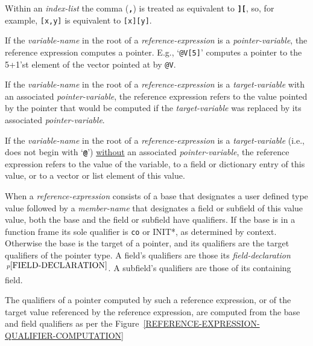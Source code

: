 \documentclass[12pt]{article}
\newcommand{\TT}[1]{{\tt \bfseries #1}}
\newcommand{\pagnote}[1]{$\,^{p\pageref{#1}}$}
\begin{document}
Within an {\em index-list} the comma (\TT{,}) is treated
as equivalent to \TT{][}, so, for example, {\tt [x,y]}
is equivalent to {\tt [x][y]}.

If the {\em variable-name} in the root of a {\em reference-expression}
is a {\em pointer-variable}, the reference expression computes a pointer.
E.g., `{\tt @V[5]}' computes a pointer to the 5+1'st element of the
vector pointed at by {\tt @V}.

If the {\em variable-name} in the root of a {\em reference-expression}
is a {\em target-variable} with an associated {\em pointer-variable},
the reference expression refers to the value pointed by the pointer
that would be computed if the {\em target-variable} was replaced by
its associated {\em pointer-variable}.

If the {\em variable-name} in the root of a {\em reference-expression}
is a {\em target-variable} (i.e., does not begin with `\TT{@}')
\underline{without}
an associated {\em pointer-variable},
the reference expression refers to the value of the variable,
to a field or dictionary entry of this value,
or to a vector or list element of this value.

When a {\em reference-expression}
\label{QUALIFIER-COMPUTATION}
consists of a base that designates
a user defined type value
followed by a {\em member-name} that designates a field
or subfield of this value
value, both the base and the field or
subfield have qualifiers.
If the base is in a function frame its sole qualifier is {\tt co}
or {\TT *INIT*}, as determined by context.
Otherwise the base is the target of a pointer, and its qualifiers
are the target qualifiers of the pointer type.  A field's qualifiers
are those its {\em field-declaration}\pagnote{FIELD-DECLARATION}.
A subfield's qualifiers are those of its containing field.

The qualifiers of a pointer computed by such a reference expression,
or of the target value referenced by the reference expression,
are computed from the base and field qualifiers as per the
Figure~\ref{REFERENCE-EXPRESSION-QUALIFIER-COMPUTATION}%
\end{document}
